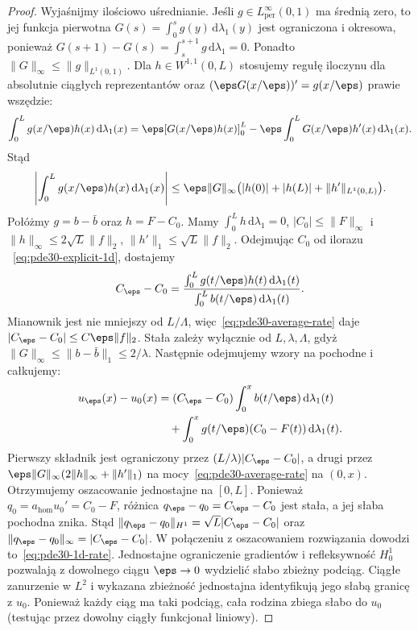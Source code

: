 \begin{proof}
Wyjaśnijmy ilościowo uśrednianie. Jeśli $g\in L^\infty_{\mathrm{per}}(0,1)$
ma średnią zero, to jej funkcja pierwotna
$G(s)=\int_0^sg(y)\,\mathrm d\lambda_1(y)$ jest ograniczona
i okresowa, ponieważ
$G(s+1)-G(s)=\int_s^{s+1}g\,\mathrm d\lambda_1=0$.
Ponadto $\|G\|_\infty\le\|g\|_{L^1(0,1)}$.
Dla $h\in W^{1,1}(0,L)$ stosujemy regułę iloczynu
dla absolutnie ciągłych reprezentantów oraz
$(\eps G(x/\eps))'=g(x/\eps)$ prawie wszędzie:
\[
 \int_0^Lg(x/\eps)h(x)\,\mathrm d\lambda_1(x)
 =\eps[G(x/\eps)h(x)]_0^L
 -\eps\int_0^LG(x/\eps)h'(x)\,\mathrm d\lambda_1(x).
\]
Stąd
\begin{equation}\label{eq:pde30-average-rate}
 \left|\int_0^Lg(x/\eps)h(x)\,\mathrm d\lambda_1(x)\right|
 \le\eps\|G\|_\infty
 \bigl(|h(0)|+|h(L)|+\|h'\|_{L^1(0,L)}\bigr).
\end{equation}
Połóżmy $g=b-\bar b$ oraz $h=F-C_0$.
Mamy $\int_0^L h\,\mathrm d\lambda_1=0$,
$|C_0|\le\|F\|_\infty$ i
$\|h\|_\infty\le2\sqrt L\|f\|_2$,
$\|h'\|_1\le\sqrt L\|f\|_2$.
Odejmując $C_0$ od ilorazu
~\eqref{eq:pde30-explicit-1d}, dostajemy
\[
 C_\eps-C_0=
 \frac{\int_0^L g(t/\eps)h(t)\,\mathrm d\lambda_1(t)}
 {\int_0^Lb(t/\eps)\,\mathrm d\lambda_1(t)}.
\]
Mianownik jest nie mniejszy od $L/\Lambda$,
więc~\eqref{eq:pde30-average-rate} daje
$|C_\eps-C_0|\le C\eps\|f\|_2$.
Stała zależy wyłącznie od $L,\lambda,\Lambda$,
gdyż $\|G\|_\infty\le\|b-\bar b\|_1\le2/\lambda$.
Następnie odejmujemy wzory na pochodne i całkujemy:
\[
 \begin{aligned}
 u_\eps(x)-u_0(x)
 &=(C_\eps-C_0)\int_0^x b(t/\eps)\,\mathrm d\lambda_1(t)\\
 &\quad+\int_0^x g(t/\eps)(C_0-F(t))\,\mathrm d\lambda_1(t).
 \end{aligned}
\]
Pierwszy składnik jest ograniczony przez
$(L/\lambda)|C_\eps-C_0|$, a drugi przez
$\eps\|G\|_\infty(2\|h\|_\infty+\|h'\|_1)$
na mocy~\eqref{eq:pde30-average-rate} na $(0,x)$.
Otrzymujemy oszacowanie jednostajne na $[0,L]$.
Ponieważ $q_0=a_{\mathrm{hom}}u_0'=C_0-F$,
różnica $q_\eps-q_0=C_\eps-C_0$ jest stała,
a jej słaba pochodna znika. Stąd
$\|q_\eps-q_0\|_{H^1}=\sqrt L|C_\eps-C_0|$
oraz $\|q_\eps-q_0\|_\infty=|C_\eps-C_0|$.
W połączeniu z oszacowaniem rozwiązania
dowodzi to~\eqref{eq:pde30-1d-rate}.
Jednostajne ograniczenie gradientów i refleksywność
$H_0^1$ pozwalają z dowolnego ciągu $\eps\to0$
wydzielić słabo zbieżny podciąg. Ciągłe zanurzenie
w $L^2$ i wykazana zbieżność jednostajna identyfikują
jego słabą granicę z $u_0$. Ponieważ każdy ciąg
ma taki podciąg, cała rodzina zbiega słabo do $u_0$
(testując przez dowolny ciągły funkcjonał liniowy).
\end{proof}

